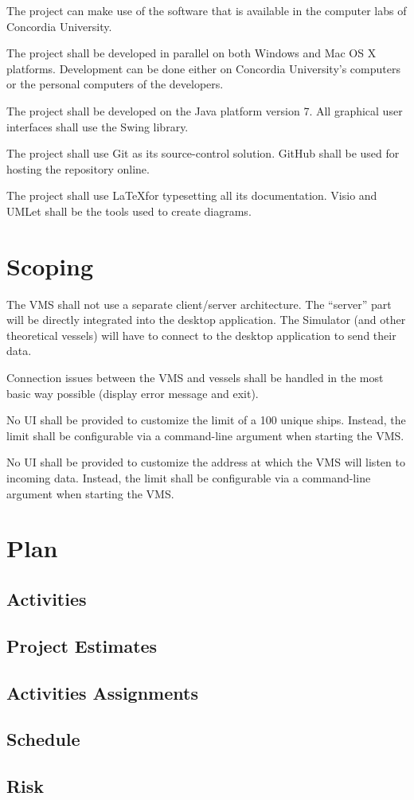 \documentclass{article}
\begin{document}
The project can make use of the software that is available in the computer labs of Concordia University. 

The project shall be developed in parallel on both Windows and Mac OS X platforms. Development can be done either on Concordia University's computers or the personal computers of the developers.

The project shall be developed on the Java platform version 7. All graphical user interfaces shall use the Swing library.

The project shall use Git as its source-control solution. GitHub shall be used for hosting the repository online.

The project shall use \LaTeX for typesetting all its documentation. Visio and UMLet shall be the tools used to create diagrams.

\section{Scoping} %
The VMS shall not use a separate client/server architecture. The ``server'' part will be directly integrated into the desktop application. The Simulator (and other theoretical vessels) will have to connect to the desktop application to send their data.

Connection issues between the VMS and vessels shall be handled in the most basic way possible (display error message and exit).

No UI shall be provided to customize the limit of a 100 unique ships. Instead, the limit shall be configurable via a command-line argument when starting the VMS. 

No UI shall be provided to customize the address at which the VMS will listen to incoming data. Instead, the limit shall be configurable via a command-line argument when starting the VMS.

\section{Plan} %

\subsection{Activities}

\subsection{Project Estimates}

\subsection{Activities Assignments}

\subsection{Schedule}

\subsection{Risk}
\end{document}
